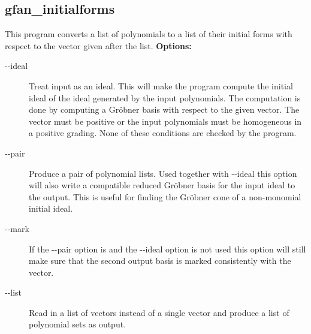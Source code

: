 {{{{{{{{{{{{{{{{\subsection{gfan\_initialforms}\label{applist:_initialforms}
This program converts a list of polynomials to a list of their initial forms with respect to the vector given after the list.
\newline
{\bf Options:}
\begin{description}
\item[-\hspace{0.013cm}-ideal]Treat input as an ideal. This will make the program compute the initial ideal of the ideal generated by the input polynomials. The computation is done by computing a Gr\"obner basis with respect to the given vector. The vector must be positive or the input polynomials must be homogeneous in a positive grading. None of these conditions are checked by the program.
\item[-\hspace{0.013cm}-pair]Produce a pair of polynomial lists. Used together with -\hspace{0.013cm}-ideal this option will also write a compatible reduced Gr\"obner basis for the input ideal to the output. This is useful for finding the Gr\"obner cone of a non-monomial initial ideal.
\item[-\hspace{0.013cm}-mark]If the -\hspace{0.013cm}-pair option is and the -\hspace{0.013cm}-ideal option is not used this option will still make sure that the second output basis is marked consistently with the vector.\item[-\hspace{0.013cm}-list]Read in a list of vectors instead of a single vector and produce a list of polynomial sets as output.\end{description}


}}}}}}}}}}}}}}}}
